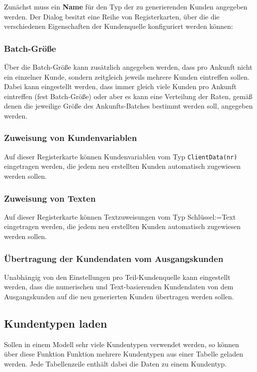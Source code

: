 Zunächst muss ein \textbf{Name} für den Typ der zu generierenden Kunden angegeben werden.
Der Dialog besitzt eine Reihe von Registerkarten, über die die verschiedenen Eigenschaften
der Kundenquelle konfiguriert werden können:

\subsubsection*{Batch-Größe}

Über die Batch-Größe kann zusätzlich
angegeben werden, dass pro Ankunft nicht ein einzelner Kunde, sondern zeitgleich jeweils
mehrere Kunden eintreffen sollen. Dabei kann eingestellt werden, dass immer gleich
viele Kunden pro Ankunft eintreffen (fest Batch-Größe) oder aber es kann eine Verteilung
der Raten, gemäß denen die jeweilige Größe des Ankunfts-Batches bestimmt werden soll,
angegeben werden.

\subsubsection*{Zuweisung von Kundenvariablen}

Auf dieser Registerkarte können Kundenvariablen vom Typ \texttt{ClientData(nr)} eingetragen werden,
die jedem neu erstellten Kunden automatisch zugewiesen werden sollen.

\subsubsection*{Zuweisung von Texten}

Auf dieser Registerkarte können Textzuweisungen vom Typ Schlüssel:=Text eingetragen werden,
die jedem neu erstellten Kunden automatisch zugewiesen werden sollen.

\subsubsection*{Übertragung der Kundendaten vom Ausgangskunden}

Unabhängig von den Einstellungen pro Teil-Kundenquelle kann eingestellt werden,
dass die numerischen und Text-basierenden Kundendaten von dem Ausgangskunden
auf die neu generierten Kunden übertragen werden sollen.

\subsection*{Kundentypen laden}

Sollen in einem Modell sehr viele Kundentypen verwendet werden, so können über diese Funktion Funktion mehrere
Kundentypen aus einer Tabelle geladen werden. Jede Tabellenzeile enthält dabei die Daten zu einem Kundentyp.

